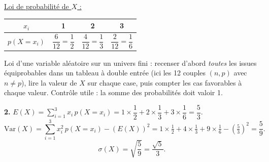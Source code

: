 \documentclass[11pt]{article}
\begin{document}
\underline{Loi de probabilité de $X$ :}
\begin{center}\renewcommand{\arraystretch}{1.6}
\begin{tabular}{|c|c|c|c|}
\hline
$x_i$ & 1 & 2 & 3 \\
\hline
$p(X = x_i)$ & $\dfrac{6}{12} = \dfrac{1}{2}$ & $\dfrac{4}{12} = \dfrac{1}{3}$ & $\dfrac{2}{12} = \dfrac{1}{6}$ \\
\hline
\end{tabular}
\end{center}

\begin{methode}
Loi d'une variable aléatoire sur un univers fini : recenser d'abord
\emph{toutes} les issues équiprobables dans un tableau à double entrée
(ici les 12 couples $(n,p)$ avec $n \ne p$), lire la valeur de $X$ sur
chaque case, puis compter les cas favorables à chaque valeur. Contrôle
utile : la somme des probabilités doit valoir 1.
\end{methode}

\textbf{2.} $E(X) = \sum_{i=1}^3 x_i\,p(X = x_i) = 1 \times \dfrac{1}{2} + 2 \times \dfrac{1}{3} + 3 \times \dfrac{1}{6} = \dfrac{5}{3}$.
\[ \mathrm{Var}(X) = \sum_{i=1}^3 x_i^2\,p(X = x_i) - (E(X))^2 = 1 \times \tfrac{1}{2} + 4 \times \tfrac{1}{3} + 9 \times \tfrac{1}{6} - \left(\tfrac{5}{3}\right)^2 = \frac{5}{9}. \]
\[ \sigma(X) = \sqrt{\frac{5}{9}} = \frac{\sqrt{5}}{3}. \]
\end{document}
